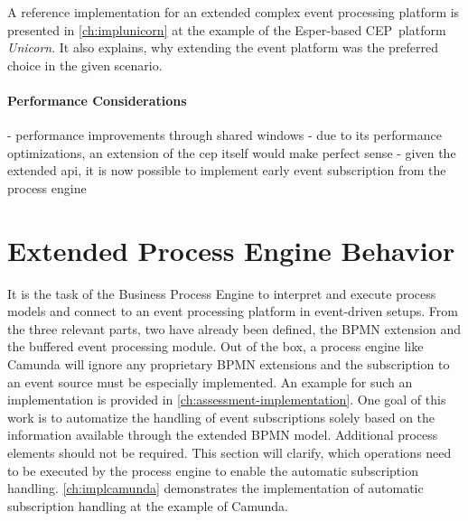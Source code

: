 A reference implementation for an extended complex event processing platform is presented in \autoref{ch:implunicorn} at the example of the Esper-based CEP~platform \textit{Unicorn}. It also explains, why extending the event platform was the preferred choice in the given scenario.


\paragraph{Performance Considerations}

- performance improvements through shared windows
- due to its performance optimizations, an extension of the cep itself would make perfect sense
- given the extended api, it is now possible to implement early event subscription from the process engine


\section{Extended Process Engine Behavior}\label{ch:extendedprocessengine}
It is the task of the Business Process Engine to interpret and execute process models and connect to an event processing platform in event-driven setups.
From the three relevant parts, two have already been defined, the BPMN extension and the buffered event processing module.
Out of the box, a process engine like Camunda will ignore any proprietary BPMN extensions and the subscription to an event source must be especially implemented. An example for such an implementation is provided in \autoref{ch:assessment-implementation}.
One goal of this work is to automatize the handling of event subscriptions solely based on the information available through the extended BPMN model. Additional process elements should not be required.
This section will clarify, which operations need to be executed by the process engine to enable the automatic subscription handling.
\autoref{ch:implcamunda} demonstrates the implementation of automatic subscription handling at the example of Camunda.

